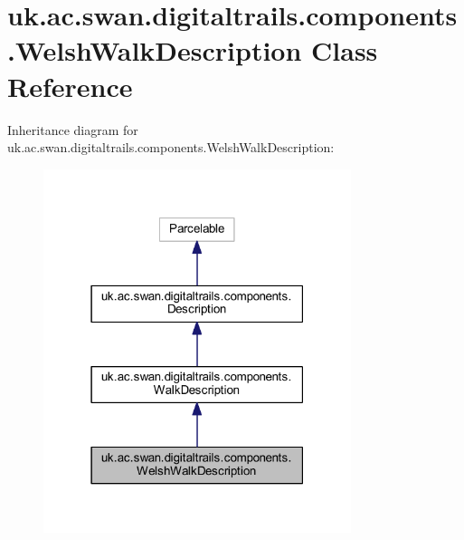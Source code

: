 \hypertarget{classuk_1_1ac_1_1swan_1_1digitaltrails_1_1components_1_1_welsh_walk_description}{\section{uk.\+ac.\+swan.\+digitaltrails.\+components.\+Welsh\+Walk\+Description Class Reference}
\label{classuk_1_1ac_1_1swan_1_1digitaltrails_1_1components_1_1_welsh_walk_description}
}


Inheritance diagram for uk.\+ac.\+swan.\+digitaltrails.\+components.\+Welsh\+Walk\+Description\+:\nopagebreak
\begin{figure}[H]
\begin{center}
\leavevmode
\includegraphics[width=255pt]{classuk_1_1ac_1_1swan_1_1digitaltrails_1_1components_1_1_welsh_walk_description__inherit__graph}
\end{center}
\end{figure}


